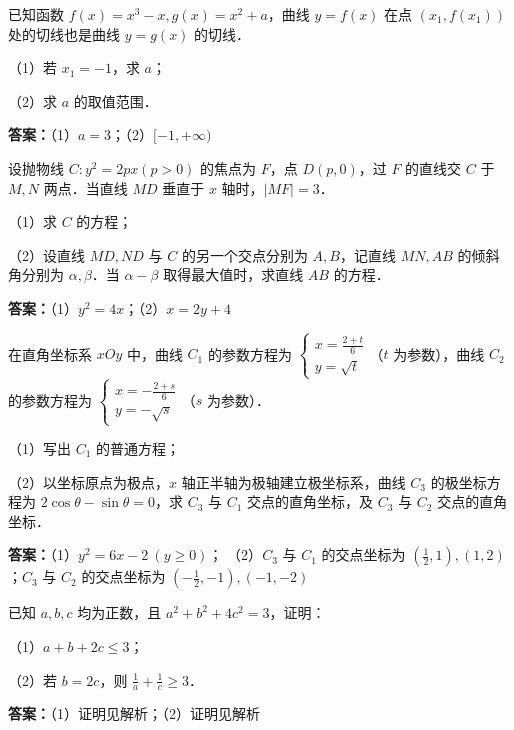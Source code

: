 \begin{question}[points=12]
已知函数 $f(x)=x^3-x, g(x)=x^2+a$，曲线 $y=f(x)$ 在点 $(x_1, f(x_1))$ 处的切线也是曲线 $y=g(x)$ 的切线．

（1）若 $x_1=-1$，求 $a$；

（2）求 $a$ 的取值范围．
\begin{solution}
\textbf{答案：}（1）$a=3$；（2）$[-1,+\infty)$
\end{solution}
\end{question}

\begin{question}[points=12]
设抛物线 $C:y^2=2px(p>0)$ 的焦点为 $F$，点 $D(p,0)$，过 $F$ 的直线交 $C$ 于 $M,N$ 两点．当直线 $MD$ 垂直于 $x$ 轴时，$|MF|=3$．

（1）求 $C$ 的方程；

（2）设直线 $MD, ND$ 与 $C$ 的另一个交点分别为 $A,B$，记直线 $MN, AB$ 的倾斜角分别为 $\alpha, \beta$．当 $\alpha-\beta$ 取得最大值时，求直线 $AB$ 的方程．
\begin{solution}
\textbf{答案：}（1）$y^2=4x$；（2）$x=2y+4$
\end{solution}
\end{question}

\begin{question}[points=10]
[选修4-4：坐标系与参数方程]

在直角坐标系 $xOy$ 中，曲线 $C_1$ 的参数方程为 $\begin{cases} x=\frac{2+t}{6} \\ y=\sqrt{t} \end{cases}$（$t$ 为参数），曲线 $C_2$ 的参数方程为 $\begin{cases} x=-\frac{2+s}{6} \\ y=-\sqrt{s} \end{cases}$（$s$ 为参数）．

（1）写出 $C_1$ 的普通方程；

（2）以坐标原点为极点，$x$ 轴正半轴为极轴建立极坐标系，曲线 $C_3$ 的极坐标方程为 $2\cos\theta-\sin\theta=0$，求 $C_3$ 与 $C_1$ 交点的直角坐标，及 $C_3$ 与 $C_2$ 交点的直角坐标．
\begin{solution}
\textbf{答案：}（1）$y^2=6x-2\ (y\ge0)$；
（2）$C_3$ 与 $C_1$ 的交点坐标为 $(\frac{1}{2},1),(1,2)$；$C_3$ 与 $C_2$ 的交点坐标为 $(-\frac{1}{2},-1),(-1,-2)$
\end{solution}
\end{question}

\begin{question}[points=10]
[选修4-5：不等式选讲]

已知 $a,b,c$ 均为正数，且 $a^2+b^2+4c^2=3$，证明：

（1）$a+b+2c\le3$；

（2）若 $b=2c$，则 $\frac{1}{a}+\frac{1}{c}\ge3$．
\begin{solution}
\textbf{答案：}（1）证明见解析；（2）证明见解析
\end{solution}
\end{question}

